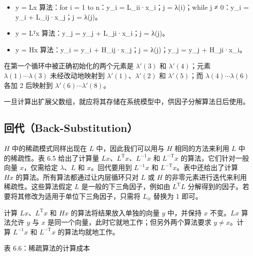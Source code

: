 \documentclass[10pt,a4paper]{book}
\theoremstyle{thmstyle} %
\theoremstyle{defstyle} %
\theoremstyle{prostyle} %
\begin{document}
\begin{itemize}

  \item y = Lx 算法：for i = 1 to n：y\_i = L\_ii·x\_i；j = λ(i)；while j ≠ 0：y\_i = y\_i + L\_ij·x\_j；j = λ(j)。

  \item y = Lᵀx 算法：y\_j = y\_j + L\_ji·x\_i；j = λ(j)。

  \item y = Hx 算法：y\_i = y\_i + H\_ij·x\_j；j = λ(j)；y\_j = y\_j + H\_ji·x\_i。

\end{itemize}





在第一个循环中被正确初始化的两个元素是 $\lambda'(3)$ 和 $\lambda'(4)$；元素 $\lambda(1)\cdots\lambda(3)$ 未经改动地映射到 $\lambda'(1)$、$\lambda'(2)$ 和 $\lambda'(5)$；而 $\lambda(4)\cdots\lambda(6)$ 各加 2 后映射到 $\lambda'(6)\cdots\lambda'(8)$。



一旦计算出扩展父数组，就应将其存储在系统模型中，供因子分解算法日后使用。



\subsection{回代（Back-Substitution）}





$H$ 中的稀疏模式同样出现在 $L$ 中，因此我们可以用与 $H$ 相同的方法来利用 $L$ 中的稀疏性。表 6.5 给出了计算量 $Lx$、$L^{\text{T}}x$、$L^{-1}x$ 和 $L^{-\text{T}}x$ 的算法，它们针对一般向量 $x$，仅需给定 $\lambda$、$L$ 和 $x$。回代要用到 $L^{-1}x$ 和 $L^{-\text{T}}x$。表中还给出了计算 $Hx$ 的算法。所有算法都通过让内层循环只对 $L$ 或 $H$ 的非零元素进行迭代来利用稀疏性。这些算法假定 $L$ 是一般的下三角因子，例如由 $L^{\text{T}}L$ 分解得到的因子。若要将其修改为适用于单位下三角因子，只需将 $L_{ii}$ 替换为 1 即可。



计算 $Lx$、$L^{\mathrm{T}}x$ 和 $Hx$ 的算法将结果放入单独的向量 $y$ 中，并保持 $x$ 不变。$Lx$ 算法允许 $y$ 与 $x$ 是同一个向量，此时它就地工作；但另外两个算法要求 $y \neq x$。计算 $L^{-1}x$ 和 $L^{-\mathrm{T}}x$ 的算法均就地工作。



表 6.6：稀疏算法的计算成本
\end{document}

